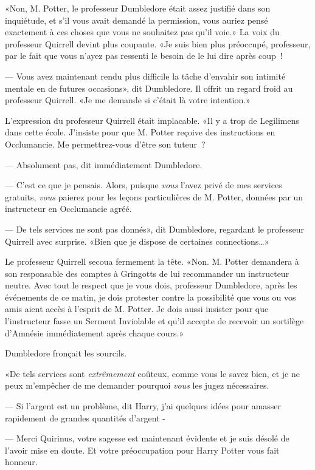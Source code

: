 «Non, M. Potter, le professeur Dumbledore était assez justifié dans son inquiétude, et s'il vous avait demandé la permission, vous auriez pensé exactement à ces choses que vous ne souhaitez pas qu'il voie.» La voix du professeur Quirrell devint plus coupante. «Je suis bien plus préoccupé, professeur, par le fait que vous n'ayez pas ressenti le besoin de le lui dire après coup~!

--- Vous avez maintenant rendu plus difficile la tâche d'envahir son intimité mentale en de futures occasions», dit Dumbledore. Il offrit un regard froid au professeur Quirrell. «Je me demande si c'était là votre intention.»

L'expression du professeur Quirrell était implacable. «Il y a trop de Legilimens dans cette école. J'insiste pour que M. Potter reçoive des instructions en Occlumancie. Me permettrez-vous d'être son tuteur~?

--- Absolument pas, dit immédiatement Dumbledore.

--- C'est ce que je pensais. Alors, puisque \emph{vous} l'avez privé de mes services gratuits, \emph{vous} paierez pour les leçons particulières de M. Potter, données par un instructeur en Occlumancie agréé.

--- De tels services ne sont pas donnés», dit Dumbledore, regardant le professeur Quirrell avec surprise. «Bien que je dispose de certaines connections…»

Le professeur Quirrell secoua fermement la tête. «Non. M. Potter demandera à son responsable des comptes à Gringotts de lui recommander un instructeur neutre. Avec tout le respect que je vous dois, professeur Dumbledore, après les événements de ce matin, je dois protester contre la possibilité que vous ou vos amis aient accès à l'esprit de M. Potter. Je dois aussi insister pour que l'instructeur fasse un Serment Inviolable et qu'il accepte de recevoir un sortilège d'Amnésie immédiatement après chaque cours.»

Dumbledore fronçait les sourcils.

«De tels services sont \emph{extrêmement} coûteux, comme vous le savez bien, et je ne peux m'empêcher de me demander pourquoi \emph{vous} les jugez nécessaires.

--- Si l'argent est un problème, dit Harry, j'ai quelques idées pour amasser rapidement de grandes quantités d'argent -

--- Merci Quirinus, votre sagesse est maintenant évidente et je suis désolé de l'avoir mise en doute. Et votre préoccupation pour Harry Potter vous fait honneur.

